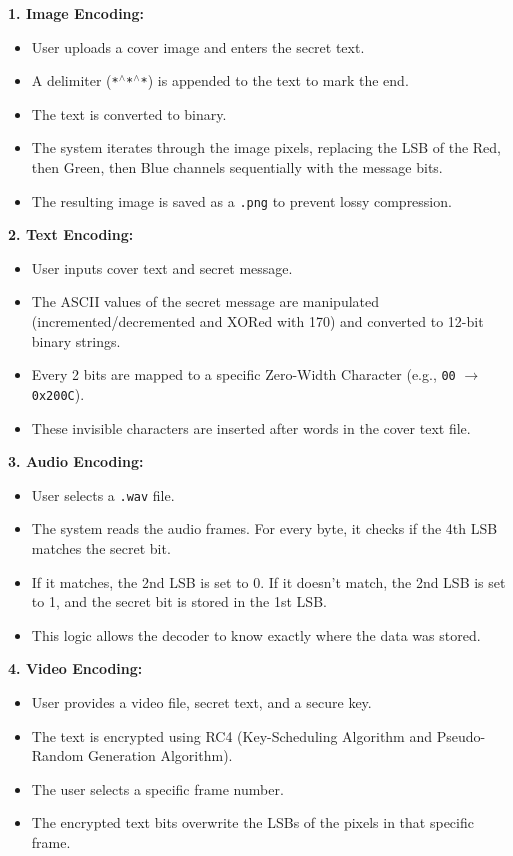 \documentclass[12pt,a4paper]{report}
\begin{document}
\textbf{1. Image Encoding:}
\begin{itemize}
    \item User uploads a cover image and enters the secret text.
    \item A delimiter (\texttt{*$^\wedge$*$^\wedge$*}) is appended to the text to mark the end.
    \item The text is converted to binary.
    \item The system iterates through the image pixels, replacing the LSB of the Red, then Green, then Blue channels sequentially with the message bits.
    \item The resulting image is saved as a \texttt{.png} to prevent lossy compression.
\end{itemize}

\textbf{2. Text Encoding:}
\begin{itemize}
    \item User inputs cover text and secret message.
    \item The ASCII values of the secret message are manipulated (incremented/decremented and XORed with 170) and converted to 12-bit binary strings.
    \item Every 2 bits are mapped to a specific Zero-Width Character (e.g., \texttt{00} $\rightarrow$ \texttt{0x200C}).
    \item These invisible characters are inserted after words in the cover text file.
\end{itemize}

\textbf{3. Audio Encoding:}
\begin{itemize}
    \item User selects a \texttt{.wav} file.
    \item The system reads the audio frames. For every byte, it checks if the 4th LSB matches the secret bit.
    \item If it matches, the 2nd LSB is set to 0. If it doesn't match, the 2nd LSB is set to 1, and the secret bit is stored in the 1st LSB.
    \item This logic allows the decoder to know exactly where the data was stored.
\end{itemize}

\textbf{4. Video Encoding:}
\begin{itemize}
    \item User provides a video file, secret text, and a secure key.
    \item The text is encrypted using RC4 (Key-Scheduling Algorithm and Pseudo-Random Generation Algorithm).
    \item The user selects a specific frame number.
    \item The encrypted text bits overwrite the LSBs of the pixels in that specific frame.
\end{itemize}
\end{document}

